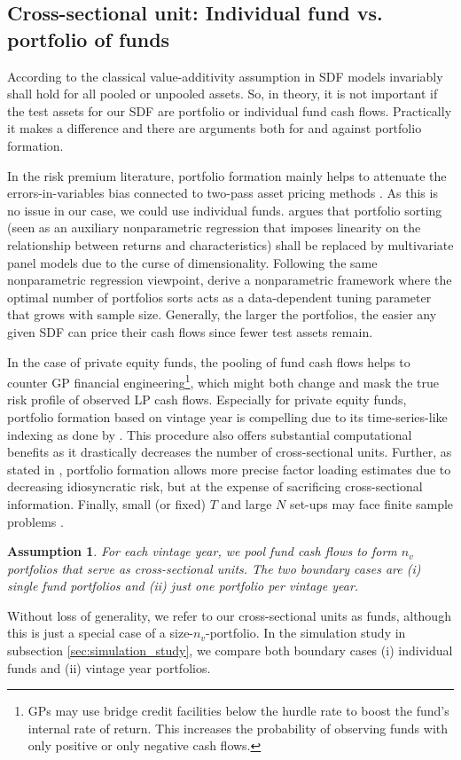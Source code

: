 \documentclass[12pt]{article}
\newtheorem{assume}{Assumption}
\begin{document}
\subsection{Cross-sectional unit: Individual fund vs. portfolio of funds}
\label{sec:cross_sectional_unit}

According to the classical value-additivity assumption in \cite{HR87} SDF models invariably shall hold for all pooled or unpooled assets.
So, in theory, it is not important if the test assets for our SDF are portfolio or individual fund cash flows.
Practically it makes a difference and there are arguments both for and against portfolio formation.

In the risk premium literature, portfolio formation mainly helps to attenuate the errors-in-variables bias connected to two-pass asset pricing methods \citep{JNPR19,PRS19}.
As this is no issue in our case, we could use individual funds.
\cite{C11} argues that portfolio sorting (seen as an auxiliary nonparametric regression that imposes linearity on the relationship between returns and characteristics) shall be replaced by multivariate panel models due to the curse of dimensionality.
Following the same nonparametric regression viewpoint, \cite{CCF19} derive a nonparametric framework where the optimal number of portfolios sorts acts as a data-dependent tuning parameter that grows with sample size.
Generally, the larger the portfolios, the easier any given SDF can price their cash flows since fewer test assets remain.

In the case of private equity funds, the pooling of fund cash flows helps to counter GP financial engineering\footnote{GPs may use bridge credit facilities below the hurdle rate to boost the fund's internal rate of return. This increases the probability of observing funds with only positive or only negative cash flows.}, which might both change and mask the true risk profile of observed LP cash flows.
Especially for private equity funds, portfolio formation based on vintage year is compelling due to its time-series-like indexing as done by \cite{DLP12}.
This procedure also offers substantial computational benefits as it drastically decreases the number of cross-sectional units.
Further, as stated in \cite{ALS20}, portfolio formation allows more precise factor loading estimates  due to decreasing idiosyncratic risk, but at the expense of sacrificing cross-sectional information.
Finally, small (or fixed) $T$ and large $N$ set-ups may face finite sample problems \citep{RRZ20}.

\begin{assume}
	\label{as:portfolio}
	For each vintage year, we pool fund cash flows to form $n_v$ portfolios that serve as cross-sectional units.
	The two boundary cases are (i) single fund portfolios and (ii) just one portfolio per vintage year. 
\end{assume}
Without loss of generality, we refer to our cross-sectional units as funds, although this is just a special case of a size-$n_v$-portfolio.
In the simulation study in subsection \ref{sec:simulation_study}, we compare both boundary cases (i) individual funds and (ii) vintage year portfolios.
\end{document}
